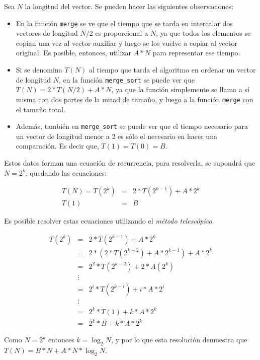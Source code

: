 Sea $N$ la longitud del vector. Se pueden hacer las siguientes
observaciones:

\begin{itemize}
\item En la función \lstinline!merge! se ve que el tiempo que se tarda en
intercalar dos vectores de longitud $N/2$ es proporcional a $N$, ya que
todos los elementos se copian una vez al vector auxiliar y luego se los
vuelve a copiar al vector original. Es posible, entonces, utilizar $A * N$
para representar ese tiempo.

\item Si se denomina $T(N)$ al tiempo que tarda el algoritmo en ordenar
un vector de longitud $N$, en la función \lstinline!merge_sort!
se puede ver que $T(N) = 2 * T(N/2) + A * N$, ya que la función simplemente
se llama a sí misma con dos partes de la mitad de tamaño, y luego a la
función \lstinline!merge! con el tamaño total.

\item Además, también en \lstinline!merge_sort! se puede ver que el tiempo
necesario para un vector de longitud menor a 2 es sólo el necesario en
hacer una comparación. Es decir que, $T(1) = T(0) = B$.
\end{itemize}

Estos datos forman una ecuación de recurrencia, para resolverla, se
supondrá que $N = 2^k$, quedando las ecuaciones:

\begin{eqnarray}
T(N) = T(2^k) &=&  2 * T(2^{k-1}) + A * 2^k \\
T(1) &=& B
\end{eqnarray}

Es posible resolver estas ecuaciones utilizando el \textit{método
telescópico}.

\begin{eqnarray}
T(2^k) &=& 2 * T(2^{k-1}) + A * 2^k \\
&=& 2*(2*T(2^{k-2} )+A*2^{k-1} )+A*2^k\\
&=& 2^2*T(2^{k-2} )+ 2*A(2^k)\\
&\vdots&\\
&=& 2^i* T(2^{k-i})+ i * A * 2^i\\
&\vdots&\\
&=&2^k*T(1) + k * A * 2^k\\
&=&2^k*B  + k * A * 2^k
\end{eqnarray}

Como $N = 2^k$ entonces $k=\log_2N$, y por lo que esta resolución demuestra
que $T(N) = B*N+A*N*\log_2N$.

